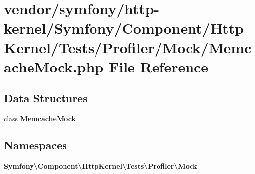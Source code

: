 \section{vendor/symfony/http-\/kernel/\+Symfony/\+Component/\+Http\+Kernel/\+Tests/\+Profiler/\+Mock/\+Memcache\+Mock.php File Reference}
\label{_memcache_mock_8php}
\subsection*{Data Structures}
\begin{DoxyCompactItemize}
\item 
class {\bf Memcache\+Mock}
\end{DoxyCompactItemize}
\subsection*{Namespaces}
\begin{DoxyCompactItemize}
\item 
 {\bf Symfony\textbackslash{}\+Component\textbackslash{}\+Http\+Kernel\textbackslash{}\+Tests\textbackslash{}\+Profiler\textbackslash{}\+Mock}
\end{DoxyCompactItemize}

